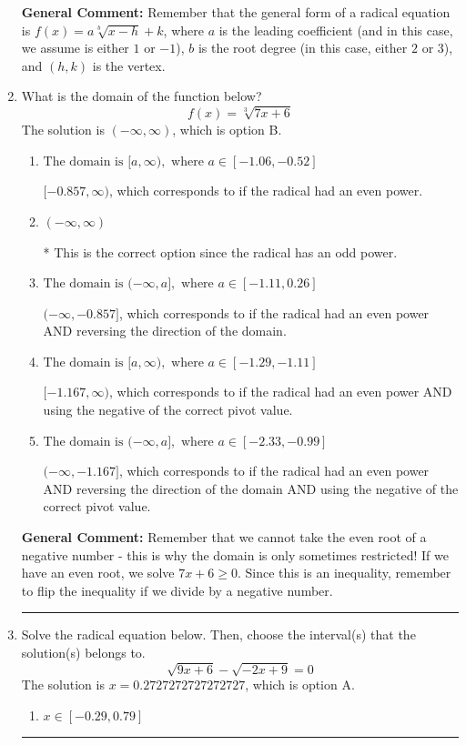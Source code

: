 \documentclass{extbook}[14pt]
\newcommand{\litem}[1]{\item #1

\rule{\textwidth}{0.4pt}}
\begin{document}
\begin{enumerate}
{\textbf{General Comment:} Remember that the general form of a radical equation is $ f(x) = a \sqrt[b]{x - h} + k$, where $a$ is the leading coefficient (and in this case, we assume is either $1$ or $-1$), $b$ is the root degree (in this case, either $2$ or $3$), and $(h, k)$ is the vertex.
}
\litem{
What is the domain of the function below?
\[ f(x) = \sqrt[3]{7 x + 6} \]The solution is \( (-\infty, \infty) \), which is option B.\begin{enumerate}[label=\Alph*.]
\item \( \text{The domain is } [a, \infty), \text{   where } a \in [-1.06, -0.52] \)

$[-0.857, \infty)$, which corresponds to if the radical had an even power.
\item \( (-\infty, \infty) \)

* This is the correct option since the radical has an odd power.
\item \( \text{The domain is } (-\infty, a], \text{   where } a \in [-1.11, 0.26] \)

$(-\infty, -0.857]$, which corresponds to if the radical had an even power AND reversing the direction of the domain.
\item \( \text{The domain is } [a, \infty), \text{   where } a \in [-1.29, -1.11] \)

$[-1.167, \infty)$, which corresponds to if the radical had an even power AND using the negative of the correct pivot value.
\item \( \text{The domain is } (-\infty, a], \text{   where } a \in [-2.33, -0.99] \)

$(-\infty, -1.167]$, which corresponds to if the radical had an even power AND reversing the direction of the domain AND using the negative of the correct pivot value.
\end{enumerate}

\textbf{General Comment:} Remember that we cannot take the even root of a negative number - this is why the domain is only sometimes restricted! If we have an even root, we solve $7 x + 6 \geq 0$. Since this is an inequality, remember to flip the inequality if we divide by a negative number.
}
\litem{
Solve the radical equation below. Then, choose the interval(s) that the solution(s) belongs to.
\[ \sqrt{9 x + 6} - \sqrt{-2 x + 9} = 0 \]The solution is \( x = 0.2727272727272727 \), which is option A.\begin{enumerate}[label=\Alph*.]
\item \( x \in [-0.29,0.79] \)


\end{enumerate}}
\end{enumerate}
\end{document}
